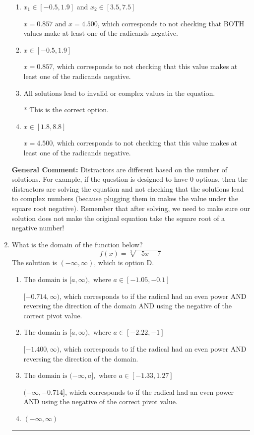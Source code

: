 \documentclass{extbook}[14pt]
\newcommand{\litem}[1]{\item #1

\rule{\textwidth}{0.4pt}}
\begin{document}
\begin{enumerate}
{\begin{enumerate}[label=\Alph*.]
$x = -0.857 \text{ and } x = -4.500$, which corresponds to getting the negatives of the values that make the equation 0.
\item \( x_1 \in [-0.5, 1.9] \text{ and } x_2 \in [3.5,7.5] \)

$x = 0.857 \text{ and } x = 4.500$, which corresponds to not checking that BOTH values make at least one of the radicands negative.
\item \( x \in [-0.5,1.9] \)

$x = 0.857$, which corresponds to not checking that this value makes at least one of the radicands negative.
\item \( \text{All solutions lead to invalid or complex values in the equation.} \)

* This is the correct option.
\item \( x \in [1.8,8.8] \)

$x = 4.500$, which corresponds to not checking that this value makes at least one of the radicands negative.
\end{enumerate}

\textbf{General Comment:} Distractors are different based on the number of solutions. For example, if the question is designed to have 0 options, then the distractors are solving the equation and not checking that the solutions lead to complex numbers (because plugging them in makes the value under the square root negative). Remember that after solving, we need to make sure our solution does not make the original equation take the square root of a negative number!
}
\litem{
What is the domain of the function below?
\[ f(x) = \sqrt[3]{-5 x - 7} \]The solution is \( (-\infty, \infty) \), which is option D.\begin{enumerate}[label=\Alph*.]
\item \( \text{The domain is } [a, \infty), \text{   where } a \in [-1.05, -0.1] \)

$[-0.714, \infty)$, which corresponds to if the radical had an even power AND reversing the direction of the domain AND using the negative of the correct pivot value.
\item \( \text{The domain is } [a, \infty), \text{   where } a \in [-2.22, -1] \)

$[-1.400, \infty)$, which corresponds to if the radical had an even power AND reversing the direction of the domain.
\item \( \text{The domain is } (-\infty, a], \text{   where } a \in [-1.33, 1.27] \)

$(-\infty, -0.714]$, which corresponds to if the radical had an even power AND using the negative of the correct pivot value.
\item \( (-\infty, \infty) \)


\end{enumerate}}
\end{enumerate}
\end{document}
